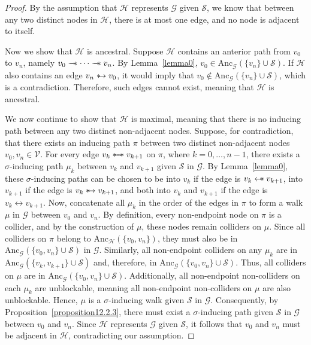 \documentclass[accepted]{uai2025} %
\newcommand{\anc}{\text{Anc}}
\newcommand{\huh}{\mathrel{\leftrightarrow}}
\newcommand{\hus}{\mathrel{{\leftarrow\mkern-11mu\ast}}}
\newcommand{\suh}{\mathrel{{\ast\mkern-11mu\to}}}
\newcommand{\tus}{\mathrel{{\relbar\mkern-11mu\relbar\mkern-11mu\ast}}}
\newcommand{\sus}{\mathrel{{\ast\mkern-11mu\relbar\mkern-9mu\relbar\mkern-11mu\ast}}}
\begin{document}
\lemmatwo*
\begin{proof}
By the assumption that \( \mathcal{H} \) represents \( \mathcal{G} \) given \( \mathcal{S} \), we know that between any two distinct nodes in \( \mathcal{H} \), there is at most one edge, and no node is adjacent to itself.

Now we show that $\mathcal{H}$ is ancestral. Suppose \( \mathcal{H} \) contains an anterior path from \( v_0 \) to \( v_n \), namely \( v_0 \tus \cdots \tus v_n \). By Lemma~\ref{lemma0}, \( v_0 \in \anc_\mathcal{G}(\{v_n\} \cup \mathcal{S}) \). If \( \mathcal{H} \) also contains an edge \( v_n \suh v_0 \), it would imply that \( v_0 \notin \anc_\mathcal{G}(\{v_n\} \cup \mathcal{S}) \), which is a contradiction. Therefore, such edges cannot exist, meaning that \( \mathcal{H} \) is ancestral.

We now continue to show that \( \mathcal{H} \) is maximal, meaning that there is no inducing path between any two distinct non-adjacent nodes. Suppose, for contradiction, that there exists an inducing path \( \pi \) between two distinct non-adjacent nodes \( v_0, v_n \in \mathcal{V} \). For every edge \( v_{k} \sus v_{k+1} \) on \( \pi \), where \( k = 0, \dots, n-1 \), there exists a \( \sigma \)-inducing path \( \mu_k \) between \( v_{k} \) and \( v_{k+1} \) given \( \mathcal{S} \) in \( \mathcal{G} \). By Lemma~\ref{lemma0}, these \( \sigma \)-inducing paths can be chosen to be into $v_k$ if the edge is \( v_{k} \hus v_{k+1} \), into \( v_{k+1} \) if the edge is \( v_{k} \suh v_{k+1} \), and both into \( v_{k} \) and \( v_{k+1} \) if the edge is \( v_{k} \huh v_{k+1} \). Now, concatenate all \( \mu_k \) in the order of the edges in \( \pi \) to form a walk \( \mu \) in \( \mathcal{G} \) between \( v_0 \) and \( v_n \). By definition, every non-endpoint node on \( \pi \) is a collider, and by the construction of \( \mu \), these nodes remain colliders on \( \mu \). Since all colliders on \( \pi \) belong to \( \anc_\mathcal{H}(\{v_0, v_n\}) \), they must also be in \( \anc_\mathcal{G}(\{v_0, v_n\} \cup \mathcal{S}) \) in \( \mathcal{G} \). Similarly, all non-endpoint colliders on any \( \mu_k \) are in \( \anc_\mathcal{G}(\{v_{k}, v_{k+1}\} \cup \mathcal{S}) \) and, therefore, in \( \anc_\mathcal{G}(\{v_0, v_n\} \cup \mathcal{S}) \). Thus, all colliders on \( \mu \) are in \( \anc_\mathcal{G}(\{v_0, v_n\} \cup \mathcal{S}) \). Additionally, all non-endpoint non-colliders on each \( \mu_k \) are unblockable, meaning all non-endpoint non-colliders on \( \mu \) are also unblockable. Hence, \( \mu \) is a \( \sigma \)-inducing walk given \( \mathcal{S} \) in \( \mathcal{G} \). Consequently, by Proposition~\ref{proposition12.2.3}, there must exist a \( \sigma \)-inducing path given \( \mathcal{S} \) in \( \mathcal{G} \) between \( v_0 \) and \( v_n \). Since \( \mathcal{H} \) represents \( \mathcal{G} \) given \( \mathcal{S} \), it follows that \( v_0 \) and \( v_n \) must be adjacent in \( \mathcal{H} \), contradicting our assumption.


\end{proof}
\end{document}
